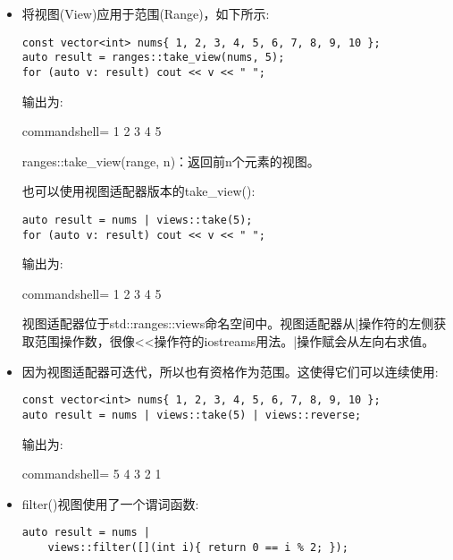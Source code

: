 \begin{itemize}
\item 
将视图(View)应用于范围(Range)，如下所示:

\begin{lstlisting}[style=styleCXX]
const vector<int> nums{ 1, 2, 3, 4, 5, 6, 7, 8, 9, 10 };
auto result = ranges::take_view(nums, 5);
for (auto v: result) cout << v << " ";
\end{lstlisting}

输出为:

\begin{tcblisting}{commandshell={}}
1 2 3 4 5
\end{tcblisting}

ranges::take\_view(range, n)：返回前n个元素的视图。

也可以使用视图适配器版本的take\_view():

\begin{lstlisting}[style=styleCXX]
auto result = nums | views::take(5);
for (auto v: result) cout << v << " ";
\end{lstlisting}

输出为:

\begin{tcblisting}{commandshell={}}
1 2 3 4 5
\end{tcblisting}

视图适配器位于std::ranges::views命名空间中。视图适配器从|操作符的左侧获取范围操作数，很像<{}<操作符的iostreams用法。|操作赋会从左向右求值。

\item 
因为视图适配器可迭代，所以也有资格作为范围。这使得它们可以连续使用:

\begin{lstlisting}[style=styleCXX]
const vector<int> nums{ 1, 2, 3, 4, 5, 6, 7, 8, 9, 10 };
auto result = nums | views::take(5) | views::reverse;
\end{lstlisting}

输出为:

\begin{tcblisting}{commandshell={}}
5 4 3 2 1
\end{tcblisting}

\item 
filter()视图使用了一个谓词函数:

\begin{lstlisting}[style=styleCXX]
auto result = nums |
	views::filter([](int i){ return 0 == i % 2; });
\end{lstlisting}


\end{itemize}
